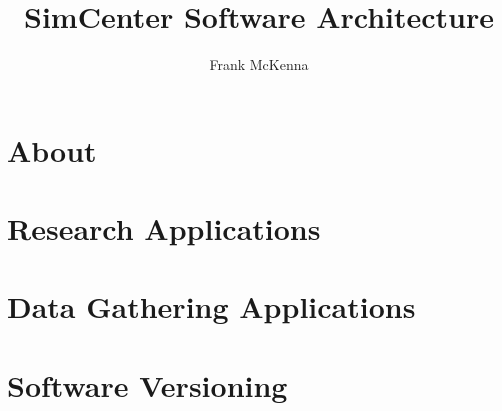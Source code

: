 \documentclass{simcenterdocumentation}
\begin{document}
\title{SimCenter Software Architecture}
\author{Frank McKenna}

\hypersetup{pageanchor=false}
\maketitle
\acknowledgments

\hypersetup{pageanchor=true}
\begin{frontmatter}

\pagestyle{plain}
{
  \renewcommand{\thispagestyle}[1]{}
  \tableofcontents
  \clearpage
  \listoffigures
  \clearpage
  \listoftables
}

\end{frontmatter}
\pagestyle{somewhatsimple}

\chapter{About}
\label{chap:about}


\chapter{Research Applications}
\label{chap:about}


\chapter{Data Gathering Applications}
\label{chap:about}


\chapter{Software Versioning}
\label{chap:versioining}


\pagestyle{plain}
{
  \renewcommand{\thispagestyle}[1]{}	
  \printbibliography           
}
\end{document}
